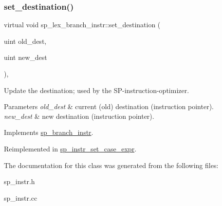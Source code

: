 \subsubsection{\texorpdfstring{set\+\_\+destination()}{set\_destination()}}
{\footnotesize\ttfamily virtual void sp\+\_\+lex\+\_\+branch\+\_\+instr\+::set\+\_\+destination (\begin{DoxyParamCaption}\item[{uint}]{old\+\_\+dest,  }\item[{uint}]{new\+\_\+dest }\end{DoxyParamCaption})\hspace{0.3cm}{\ttfamily [inline]}, {\ttfamily [virtual]}}

Update the destination; used by the SP-\/instruction-\/optimizer.


\begin{DoxyParams}{Parameters}
{\em old\+\_\+dest} & current (old) destination (instruction pointer). \\
\hline
{\em new\+\_\+dest} & new destination (instruction pointer). \\
\hline
\end{DoxyParams}


Implements \mbox{\hyperlink{classsp__branch__instr_ad5bc8e2fede785323c1749b6269869c3}{sp\+\_\+branch\+\_\+instr}}.



Reimplemented in \mbox{\hyperlink{classsp__instr__set__case__expr_a7b2952b03aa0a30f407d88fd75ebdbae}{sp\+\_\+instr\+\_\+set\+\_\+case\+\_\+expr}}.



The documentation for this class was generated from the following files\+:\begin{DoxyCompactItemize}
\item 
sp\+\_\+instr.\+h\item 
sp\+\_\+instr.\+cc\end{DoxyCompactItemize}
